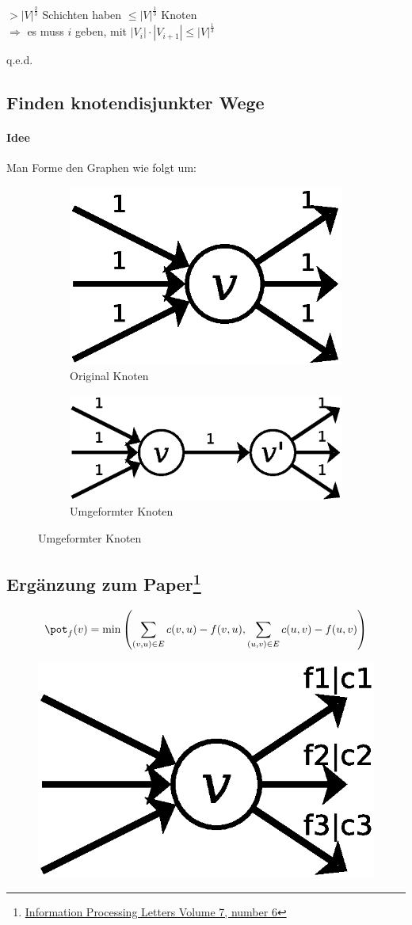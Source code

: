 $>|V|^\frac{2}{3}$ Schichten haben $\leq |V|^\frac{1}{3}$ Knoten\\
$\Rightarrow$ es muss $i$ geben, mit $|V_i|\cdot|V_{i+1}|\leq |V|^\frac{1}{3}$
\begin{flushright}
	q.e.d.
\end{flushright}
\subsection{Finden knotendisjunkter Wege}
\paragraph{Idee} Man Forme den Graphen wie folgt um:
\begin{figure}[H]
\centering
\begin{subfigure}[H]{0.4\linewidth}
	\centering
\includegraphics[width=0.5\linewidth]{28/Grafik/Diagramm2}
\caption{Original Knoten}
\label{fig:Diagramm2}
\end{subfigure}
\begin{subfigure}[H]{0.4\linewidth}
	\centering
	\includegraphics[width=\linewidth]{28/Grafik/Diagramm3}
	\caption{Umgeformter Knoten}
	\label{fig:Diagramm3}
\end{subfigure}
\end{figure}
\subsection[Ergänzung zum Paper]{Ergänzung zum Paper\footnote{\href{http://www.sciencedirect.com/science/article/pii/0020019078900169}{Information Processing Letters Volume 7, number 6}}}

\[ \pot_f(v)=\min\left( \sum_{(v,u)\in E}c(v,u)-f(v,u),\sum_{(u,v)\in E}c(u,v)-f(u,v) \right) \]
\begin{figure}[h]
\centering
\includegraphics[width=0.2\linewidth]{28/Grafik/Diagramm4}
\caption{}
\label{fig:Diagramm4}
\end{figure}

